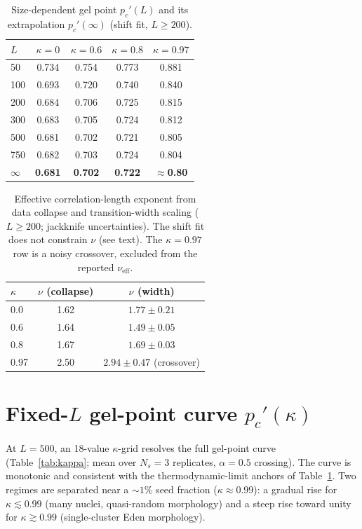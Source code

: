 \documentclass[aps,prl,onecolumn,superscriptaddress,nofootinbib]{revtex4-2}
\newcommand{\pcp}{p_c'}
\newcommand{\kap}{\kappa}
\newcommand{\nueff}{\nu_{\mathrm{eff}}}
\begin{document}
\begin{table}[h]
\centering
\caption{Size-dependent gel point $\pcp(L)$ and its extrapolation $\pcp(\infty)$
(shift fit, $L\ge200$).}
\label{tab:pcL}
\begin{tabular}{lcccc}
\toprule
$L$ & $\kap=0$ & $\kap=0.6$ & $\kap=0.8$ & $\kap=0.97$ \\
\midrule
50   & 0.734 & 0.754 & 0.773 & 0.881 \\
100  & 0.693 & 0.720 & 0.740 & 0.840 \\
200  & 0.684 & 0.706 & 0.725 & 0.815 \\
300  & 0.683 & 0.705 & 0.724 & 0.812 \\
500  & 0.681 & 0.702 & 0.721 & 0.805 \\
750  & 0.682 & 0.703 & 0.724 & 0.804 \\
\midrule
$\infty$ & \textbf{0.681} & \textbf{0.702} & \textbf{0.722} & \textbf{$\approx$0.80} \\
\bottomrule
\end{tabular}
\end{table}

\begin{table}[h]
\centering
\caption{Effective correlation-length exponent from data collapse and transition-width scaling
($L\ge200$; jackknife uncertainties). The shift fit does not constrain $\nu$ (see text). The
$\kap=0.97$ row is a noisy crossover, excluded from the reported $\nueff$.}
\label{tab:nu}
\begin{tabular}{lcc}
\toprule
$\kap$ & $\nu$ (collapse) & $\nu$ (width) \\
\midrule
0.0  & 1.62 & $1.77\pm0.21$ \\
0.6  & 1.64 & $1.49\pm0.05$ \\
0.8  & 1.67 & $1.69\pm0.03$ \\
0.97 & 2.50 & $2.94\pm0.47$ \;(crossover) \\
\bottomrule
\end{tabular}
\end{table}

\section{Fixed-$L$ gel-point curve $\pcp(\kap)$}
At $L=500$, an 18-value $\kap$-grid resolves the full gel-point curve (Table~\ref{tab:kappa};
mean over $N_s=3$ replicates, $\alpha=0.5$ crossing). The curve is monotonic and consistent with
the thermodynamic-limit anchors of Table~\ref{tab:pcL}. Two regimes are separated near a $\sim1\%$
seed fraction ($\kap\approx0.99$): a gradual rise for $\kap\lesssim0.99$ (many nuclei,
quasi-random morphology) and a steep rise toward unity for $\kap\gtrsim0.99$ (single-cluster
Eden morphology).
\end{document}
